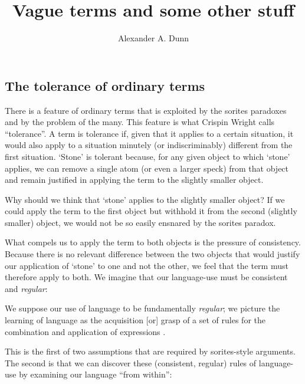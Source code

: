\documentclass[11pt]{standalone}
\title{Vague terms and some other stuff}
\author{Alexander A. Dunn}
\newenvironment{squote}{%
\begin{spacing}{1}
       	\begin{list}{}{%
\setlength{\labelwidth}{0pt}%
\rightmargin\leftmargin%
}
\item\relax
}{%
\end{list}%
\end{spacing}
}
\begin{document}
\ifstandalone
\maketitle
\begin{spacing}{1.5}
\fi

\section{The tolerance of ordinary terms}
There is a feature of ordinary terms that is exploited by the sorites
paradoxes and by the problem of the many.  This feature is what
Crispin Wright calls ``tolerance''.  A term is tolerance if, given
that it applies to a certain situation, it would also apply to a
situation minutely (or indiscriminably) different from the first
situation.  `Stone' is tolerant because, for any given object to which
`stone' applies, we can remove a single atom (or even a larger speck)
from that object and remain justified in applying the term to the
slightly smaller object.

Why should we think that `stone' applies to the slightly smaller
object?  If we could apply the term to the first object but withhold
it from the second (slightly smaller) object, we would not be so
easily ensnared by the sorites paradox.

What compels us to apply the term to both objects is the pressure of
consistency.  Because there is no relevant difference between the two
objects that would justify our application of `stone' to one and not
the other, we feel that the term must therefore apply to both.  We
imagine that our language-use must be consistent and {\em regular}:

\begin{squote}
We suppose our use of language to be fundamentally {\em regular}; we
picture the learning of language as the acquisition [or] grasp of a
set of rules for the combination and application of expressions
\citep[326]{wright1975}.
\end{squote}

This is the first of two assumptions that are required by
sorites-style arguments.  The second is that we can discover these
(consistent, regular) rules of language-use by examining our language
``from within'':


\end{spacing}
\end{document}

